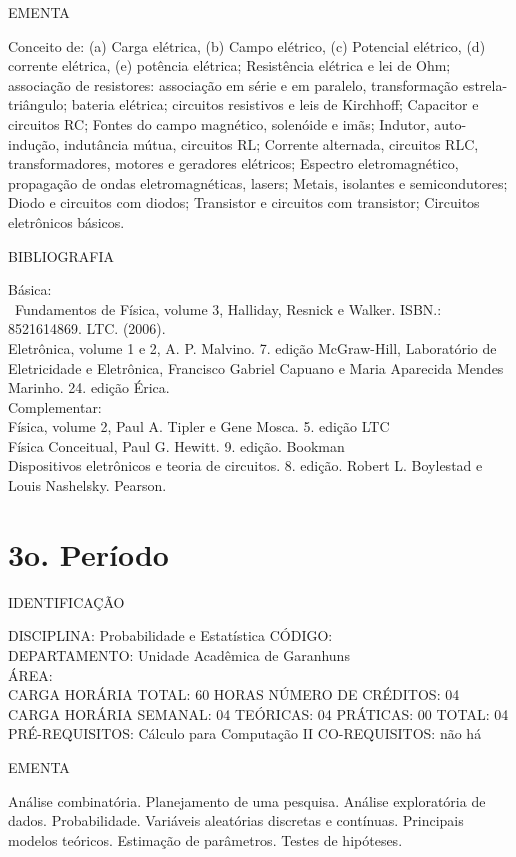 \documentclass[
	12pt,				%
	openright,			%
  oneside,     %
	a4paper,			%
	english,			%
	french,				%
	spanish,			%
	brazil				%
	]{abntex2}
\begin{document}
\begin{apendicesenv}
EMENTA 

Conceito de: (a) Carga elétrica, (b) Campo elétrico, (c) Potencial
elétrico, (d) corrente elétrica, (e) potência elétrica; Resistência
elétrica e lei de Ohm; associação de resistores: associação em série e
em paralelo, transformação estrela-triângulo; bateria elétrica;
circuitos resistivos e leis de Kirchhoff; Capacitor e circuitos RC;
Fontes do campo magnético, solenóide e imãs; Indutor, auto-indução,
indutância mútua, circuitos RL; Corrente alternada, circuitos RLC,
transformadores, motores e geradores elétricos; Espectro
eletromagnético, propagação de ondas eletromagnéticas, lasers; Metais,
isolantes e semicondutores; Diodo e circuitos com diodos; Transistor e
circuitos com transistor; Circuitos eletrônicos básicos.

BIBLIOGRAFIA 

Básica:\\\
Fundamentos de Física, volume 3, Halliday, Resnick e Walker. ISBN.:
8521614869. LTC. (2006).\\
Eletrônica, volume 1 e 2, A. P. Malvino. 7. edição McGraw-Hill,
Laboratório de Eletricidade e Eletrônica, Francisco Gabriel Capuano e
Maria Aparecida Mendes Marinho. 24. edição Érica.\\
Complementar:\\
Física, volume 2, Paul A. Tipler e Gene Mosca. 5. edição LTC\\
Física Conceitual, Paul G. Hewitt. 9. edição. Bookman\\
Dispositivos eletrônicos e teoria de circuitos. 8. edição. Robert L.
Boylestad e Louis Nashelsky. Pearson.
\newpage

\section*{3o. Período}

IDENTIFICAÇÃO 

DISCIPLINA: Probabilidade e Estatística CÓDIGO:\\
DEPARTAMENTO: Unidade Acadêmica de Garanhuns\\
ÁREA: \\
CARGA HORÁRIA TOTAL: 60 HORAS NÚMERO DE CRÉDITOS: 04\\
CARGA HORÁRIA SEMANAL: 04 TEÓRICAS: 04 PRÁTICAS: 00 TOTAL: 04\\
PRÉ-REQUISITOS: Cálculo para Computação II
CO-REQUISITOS: não há

EMENTA 

Análise combinatória. Planejamento de uma pesquisa. Análise exploratória
de dados. Probabilidade. Variáveis aleatórias discretas e contínuas.
Principais modelos teóricos. Estimação de parâmetros. Testes de
hipóteses.


\end{apendicesenv}
\end{document}

